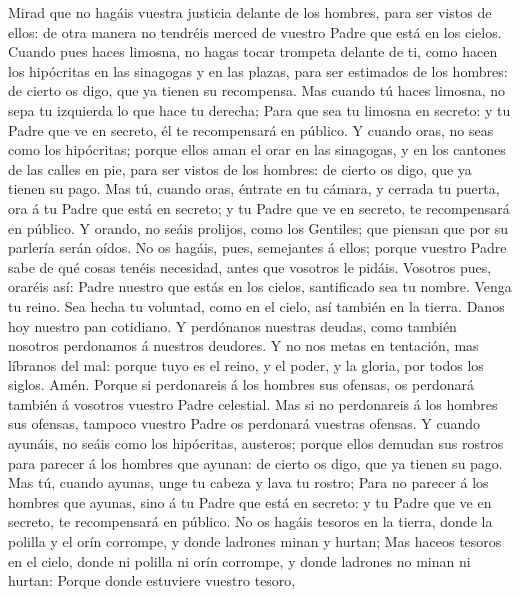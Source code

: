  Mirad que no hagáis vuestra justicia delante de los
hombres, para ser vistos de ellos: de otra manera no tendréis merced de
vuestro Padre que está en los cielos.  Cuando pues haces
limosna, no hagas tocar trompeta delante de ti, como hacen los
hipócritas en las sinagogas y en las plazas, para ser estimados de los
hombres: de cierto os digo, que ya tienen su recompensa. 
Mas cuando tú haces limosna, no sepa tu izquierda lo que hace tu
derecha;  Para que sea tu limosna en secreto: y tu Padre que
ve en secreto, él te recompensará en público.  Y cuando
oras, no seas como los hipócritas; porque ellos aman el orar en las
sinagogas, y en los cantones de las calles en pie, para ser vistos de
los hombres: de cierto os digo, que ya tienen su pago.  Mas
tú, cuando oras, éntrate en tu cámara, y cerrada tu puerta, ora á tu
Padre que está en secreto; y tu Padre que ve en secreto, te recompensará
en público.  Y orando, no seáis prolijos, como los Gentiles;
que piensan que por su parlería serán oídos.  No os hagáis,
pues, semejantes á ellos; porque vuestro Padre sabe de qué cosas tenéis
necesidad, antes que vosotros le pidáis.  Vosotros pues,
oraréis así: Padre nuestro que estás en los cielos, santificado sea tu
nombre.  Venga tu reino. Sea hecha tu voluntad, como en el
cielo, así también en la tierra.  Danos hoy nuestro pan
cotidiano.  Y perdónanos nuestras deudas, como también
nosotros perdonamos á nuestros deudores.  Y no nos metas en
tentación, mas líbranos del mal: porque tuyo es el reino, y el poder, y
la gloria, por todos los siglos. Amén.  Porque si
perdonareis á los hombres sus ofensas, os perdonará también á vosotros
vuestro Padre celestial.  Mas si no perdonareis á los
hombres sus ofensas, tampoco vuestro Padre os perdonará vuestras
ofensas.  Y cuando ayunáis, no seáis como los hipócritas,
austeros; porque ellos demudan sus rostros para parecer á los hombres
que ayunan: de cierto os digo, que ya tienen su pago.  Mas
tú, cuando ayunas, unge tu cabeza y lava tu rostro;  Para
no parecer á los hombres que ayunas, sino á tu Padre que está en
secreto: y tu Padre que ve en secreto, te recompensará en público.
 No os hagáis tesoros en la tierra, donde la polilla y el
orín corrompe, y donde ladrones minan y hurtan;  Mas haceos
tesoros en el cielo, donde ni polilla ni orín corrompe, y donde ladrones
no minan ni hurtan:  Porque donde estuviere vuestro tesoro,
